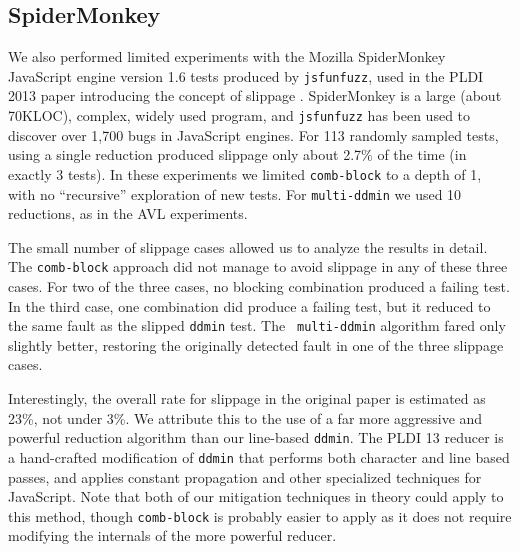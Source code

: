 \subsection{SpiderMonkey}

We also performed limited experiments with the Mozilla
SpiderMonkey JavaScript engine version 1.6 tests produced by {\tt jsfunfuzz}, used in the PLDI 2013 paper introducing
the concept of slippage \cite{PLDI13}.  SpiderMonkey is a large (about
70KLOC), complex, widely used program, and {\tt jsfunfuzz}
\cite{jsfunfuzz} has been used to discover over 1,700 bugs in
JavaScript engines.  For 113 randomly sampled
tests, using a single reduction produced slippage only about 2.7\% of the
time (in exactly 3 tests).  In these experiments we limited
{\tt comb-block} to a depth of 1, with no ``recursive'' exploration of
new tests.  For {\tt multi-ddmin} we used 10 reductions, as in the AVL experiments.

The small number of slippage cases
allowed us to analyze the results in detail.  The {\tt comb-block} approach did
not manage to avoid slippage in any of these three cases.  For two
of the three cases, no blocking combination produced a failing test.
In the third case, one combination did produce a failing test, but it
reduced to the same fault as the slipped {\tt ddmin} test.  The {\tt
  multi-ddmin} algorithm fared only slightly better, restoring the
originally detected fault in one of the three slippage cases.

Interestingly, the overall rate for slippage in the original paper is
estimated as 23\%, not under 3\%.  We attribute this to the use of a
far more aggressive and powerful reduction algorithm than our
line-based {\tt ddmin}.  The PLDI 13 reducer is a hand-crafted
modification of {\tt ddmin} that performs both character and line
based passes, and applies constant propagation and other specialized
techniques for JavaScript.  Note that both of our mitigation
techniques in theory could apply to this method, though {\tt comb-block} is
probably easier to apply as it does not require modifying the internals of the
more powerful reducer.

